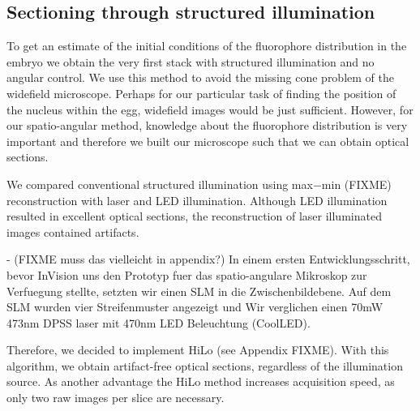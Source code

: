 \subsection{Sectioning through structured illumination} 
To get an estimate of the initial conditions of the fluorophore
distribution in the embryo we obtain the very first stack with
structured illumination and no angular control. We use this method to
avoid the missing cone problem of the widefield microscope. Perhaps
for our particular task of finding the position of the nucleus within
the egg, widefield images would be just sufficient.  However, for our
spatio-angular method, knowledge about the fluorophore distribution is
very important and therefore we built our microscope such that we can
obtain optical sections.

We compared conventional structured illumination using max$-$min
(FIXME) reconstruction with laser and LED illumination. Although LED
illumination resulted in excellent optical sections, the
reconstruction of laser illuminated images contained artifacts.

{\color{red} - (FIXME muss das vielleicht in appendix?) In einem
ersten Entwicklungsschritt, bevor InVision uns den Prototyp fuer das
spatio-angulare Mikroskop zur Verfuegung stellte, setzten wir einen
SLM in die Zwischenbildebene. Auf dem SLM wurden vier Streifenmuster
angezeigt und Wir verglichen einen 70mW 473nm DPSS laser mit 470nm LED
Beleuchtung (CoolLED).}

Therefore, we decided to implement HiLo (see Appendix FIXME). With
this algorithm, we obtain artifact-free optical sections, regardless
of the illumination source. As another advantage the HiLo method
increases acquisition speed, as only two raw images per slice are
necessary.



